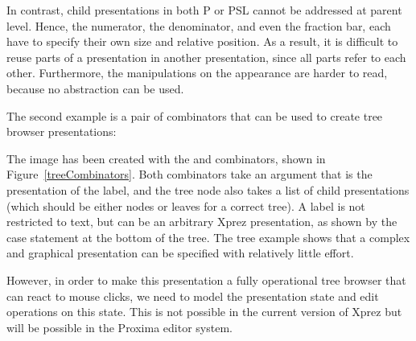 In contrast, child presentations in both P or PSL cannot be addressed at parent level. Hence, the numerator, the denominator, and even the fraction bar, each have to specify their own size and relative position. As a result, it is difficult to reuse parts of a presentation in another presentation, since all parts refer to each other. Furthermore,  the manipulations on the appearance are harder to read, because no abstraction can be used. 


The second example is a pair of combinators that can be used to create tree browser presentations:

\begin{center}
\end{center}


The image has been created with the  and  combinators, shown in Figure~\ref{treeCombinators}. Both combinators take an  argument that is the presentation of the label, and the tree node also takes a list of child presentations (which should be either nodes or leaves for a correct tree). A label is not restricted to text, but can be an arbitrary {\sc Xprez} presentation, as shown by the case statement at the bottom of the tree. The tree example shows that a complex and graphical presentation can be specified with relatively little effort.

\bc However, in order to make this presentation a fully operational tree browser that can react to mouse clicks, we need to model the presentation state and edit operations on this state. This is not possible in the current version of {\sc Xprez} but will be possible in the Proxima editor system.
\ec

